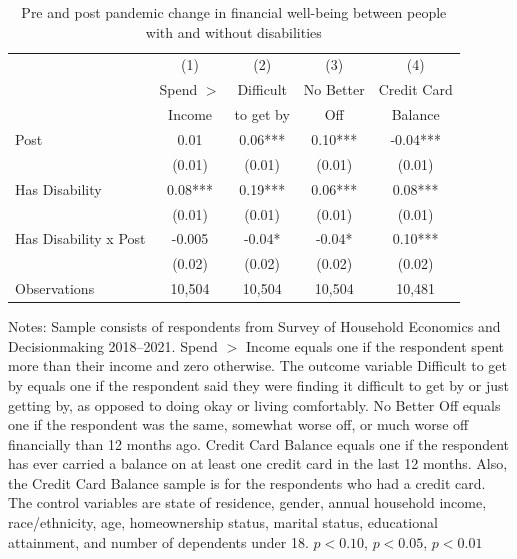 \documentclass[12pt]{article}
\begin{document}
\begin{table}
\begin{minipage}{0.85\textwidth}
\end{minipage}
\end{table}


\begin{table}[]
\centering
\caption{Pre and post pandemic change in financial well-being between people with and without disabilities}\label{shedregs}
{
\def\sym#1{\ifmmode^{#1}\else\(^{#1}\)\fi}
\begin{tabular}{l*{4}{c}}
\hline\hline
                    &\multicolumn{1}{c}{(1)}&\multicolumn{1}{c}{(2)}&\multicolumn{1}{c}{(3)}&\multicolumn{1}{c}{(4)}\\
        ~ & Spend $>$ & Difficult & No Better & Credit Card \\ 
        & Income&to get by&Off&   Balance \\ \hline
        Post & 0.01  & 0.06***  & 0.10*** & -0.04***   \\ 
        & (0.01) & (0.01) & (0.01) &  (0.01)  \\ 
      Has Disability & 0.08***  & 0.19***  & 0.06***  & 0.08***   \\ 
          & (0.01) & (0.01) & (0.01) &(0.01)  \\ 
          Has Disability x Post & -0.005  & -0.04*  & -0.04* & 0.10***  \\ 
        & (0.02) &  (0.02) & (0.02) & (0.02)  \\ \hline
        Observations & 10,504 & 10,504 & 10,504 & 10,481\\ \hline\hline
    \end{tabular}%
    }
    \medskip
\begin{minipage}{0.85\textwidth} 
{\footnotesize Notes: Sample  consists of respondents from Survey of Household Economics and Decisionmaking 2018--2021. Spend $>$ Income equals one if the respondent spent more than their income and zero otherwise. The outcome variable Difficult to get by equals one if the respondent said they were finding it difficult to get by or just getting by, as opposed to doing okay or living comfortably. No Better Off equals one if the respondent was the same, somewhat worse off, or much worse off financially than 12 months ago. Credit Card Balance equals one if the respondent has ever carried a balance on at least one credit card in the last 12 months. Also, the Credit Card Balance sample is for the respondents who had a credit card. The control variables are state of residence, gender, annual household income, race/ethnicity, age, homeownership status, marital status, educational attainment, and number of dependents under 18. \sym{*} \(p<0.10\), \sym{**} \(p<0.05\), \sym{***} \(p<0.01\) \par }
\end{minipage}
\end{table}
\end{document}
